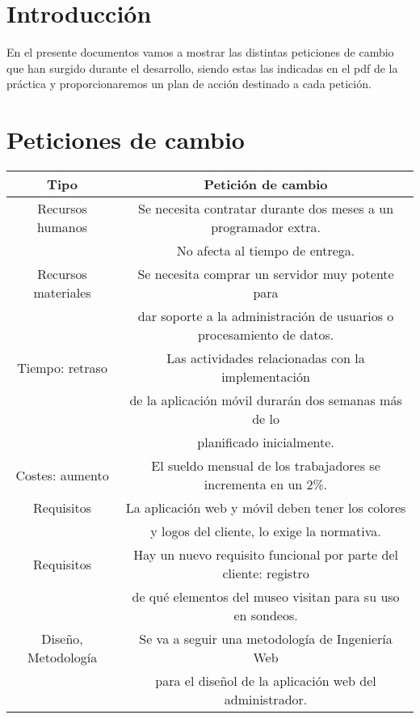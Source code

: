 	
	\newpage	
 
\section{Introducción}

En el presente documentos vamos a mostrar las distintas peticiones de cambio que han surgido durante el desarrollo, siendo estas las indicadas en el pdf de la práctica y proporcionaremos un plan de acción destinado a cada petición.

\section{Peticiones de cambio}

\begin{table}[H]
	\begin{center}
		\begin{tabular}{|c|c|} \toprule
			Tipo & Petición de cambio \\ \midrule
			Recursos humanos & Se necesita contratar durante dos meses a un programador extra.    \\
			& No afecta al tiempo de entrega. \\ 
			Recursos materiales & Se necesita comprar un servidor muy potente para  \\
			& dar soporte a la administración de usuarios o procesamiento de datos. \\
			Tiempo: retraso & Las actividades relacionadas con la implementación  \\
			& de la aplicación móvil durarán dos semanas más de lo  \\
			& planificado inicialmente. \\
			Costes: aumento &  El sueldo mensual de los trabajadores se incrementa en un 2\%. \\
			Requisitos &  La aplicación web y móvil deben tener los colores \\
			& y logos del cliente, lo exige la normativa. \\
			Requisitos & Hay un nuevo requisito funcional por parte del cliente: registro  \\
			& de qué elementos del museo visitan para su uso en sondeos. \\
			Diseño, Metodología & Se va a seguir una metodología de Ingeniería Web   \\
			& para el diseñol de la aplicación web del administrador. \\

\end{tabular}
\end{center}
\end{table}
